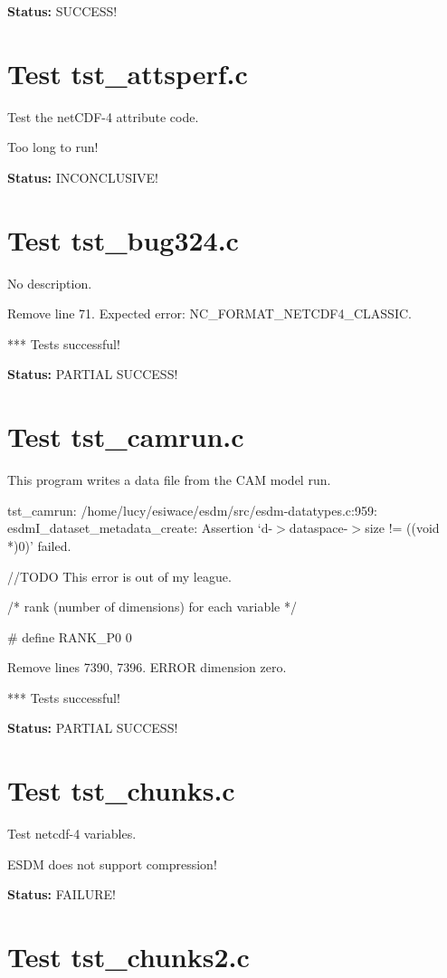 {\bf \large Status: } SUCCESS!

\section{Test tst\_attsperf.c}

Test the netCDF-4 attribute code.

Too long to run!

{\bf \large Status: } INCONCLUSIVE!

\section{Test tst\_bug324.c}

No description.

Remove line 71. Expected error: NC\_FORMAT\_NETCDF4\_CLASSIC.

*** Tests successful!

{\bf \large Status: } PARTIAL SUCCESS!

\section{Test tst\_camrun.c}

This program writes a data file from the CAM model run.

tst\_camrun: /home/lucy/esiwace/esdm/src/esdm-datatypes.c:959: esdmI\_dataset\_metadata\_create: Assertion `d-$>$dataspace-$>$size != ((void *)0)' failed.

//TODO This error is out of my league.

/* rank (number of dimensions) for each variable */

\#   define RANK\_P0 0

Remove lines 7390, 7396. ERROR dimension zero.

*** Tests successful!

{\bf \large Status: } PARTIAL SUCCESS!

\section{Test tst\_chunks.c}

Test netcdf-4 variables.

ESDM does not support compression!

{\bf \large Status: } FAILURE!

\section{Test tst\_chunks2.c}

